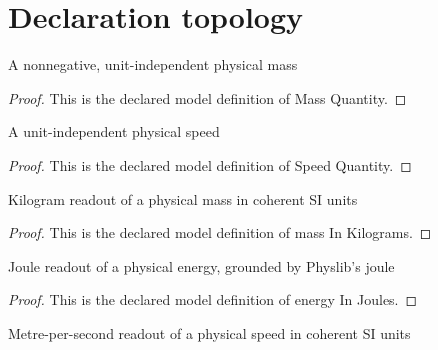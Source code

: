 \section{Declaration topology}
\begin{definition}
  \label{def:physics:phyx-mini-0573:phyxminiproblems-problemphyxmini0573-massquantity}
  A nonnegative, unit-independent physical mass
\end{definition}
\begin{proof}
  This is the declared model definition of Mass Quantity.
\end{proof}
\begin{definition}
  \label{def:physics:phyx-mini-0573:phyxminiproblems-problemphyxmini0573-speedquantity}
  A unit-independent physical speed
\end{definition}
\begin{proof}
  This is the declared model definition of Speed Quantity.
\end{proof}
\begin{definition}
  \label{def:physics:phyx-mini-0573:phyxminiproblems-problemphyxmini0573-massinkilograms}
  Kilogram readout of a physical mass in coherent SI units
\end{definition}
\begin{proof}
  This is the declared model definition of mass In Kilograms.
\end{proof}
\begin{definition}
  \label{def:physics:phyx-mini-0573:phyxminiproblems-problemphyxmini0573-energyinjoules}
  Joule readout of a physical energy, grounded by Physlib's joule
\end{definition}
\begin{proof}
  This is the declared model definition of energy In Joules.
\end{proof}
\begin{definition}
  \label{def:physics:phyx-mini-0573:phyxminiproblems-problemphyxmini0573-speedinmeterspersecond}
  Metre-per-second readout of a physical speed in coherent SI units
\end{definition}
